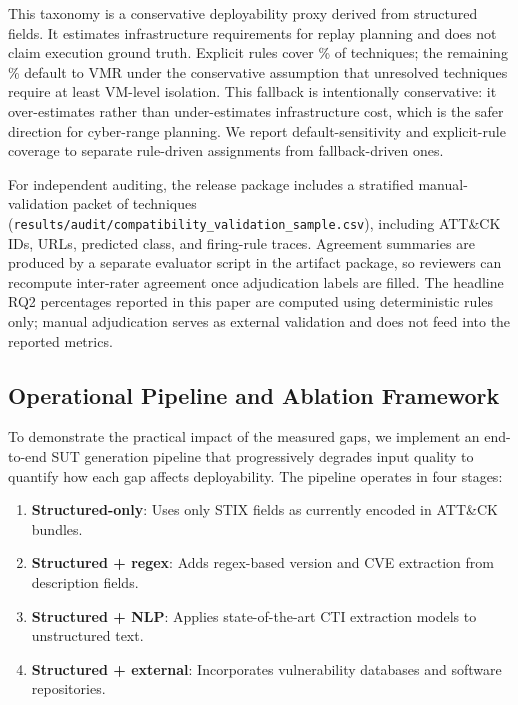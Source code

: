 \documentclass[sigconf,anonymous,review]{acmart}
\begin{document}
This taxonomy is a conservative deployability proxy derived from structured fields. It estimates infrastructure requirements for replay planning and does not claim execution ground truth. Explicit rules cover \compatibilityexplicitassignmentpercentage\% of techniques; the remaining \compatibilityfallbackassignmentpercentage\% default to VMR under the conservative assumption that unresolved techniques require at least VM-level isolation. This fallback is intentionally conservative: it over-estimates rather than under-estimates infrastructure cost, which is the safer direction for cyber-range planning. We report default-sensitivity and explicit-rule coverage to separate rule-driven assignments from fallback-driven ones.

For independent auditing, the release package includes a stratified manual-validation packet of \compatibilityvalidationsamplesize{} techniques (\nolinkurl{results/audit/compatibility_validation_sample.csv}), including ATT\&CK IDs, URLs, predicted class, and firing-rule traces. Agreement summaries are produced by a separate evaluator script in the artifact package, so reviewers can recompute inter-rater agreement once adjudication labels are filled. The headline RQ2 percentages reported in this paper are computed using deterministic rules only; manual adjudication serves as external validation and does not feed into the reported metrics.

\subsection{Operational Pipeline and Ablation Framework}

To demonstrate the practical impact of the measured gaps, we implement an end-to-end SUT generation pipeline that progressively degrades input quality to quantify how each gap affects deployability. The pipeline operates in four stages:

\begin{enumerate}[leftmargin=1.2em,itemsep=0.2em,topsep=0.2em]
\item \textbf{Structured-only}: Uses only STIX fields as currently encoded in ATT\&CK bundles.
\item \textbf{Structured + regex}: Adds regex-based version and CVE extraction from description fields.
\item \textbf{Structured + NLP}: Applies state-of-the-art CTI extraction models to unstructured text.
\item \textbf{Structured + external}: Incorporates vulnerability databases and software repositories.
\end{enumerate}
\end{document}
